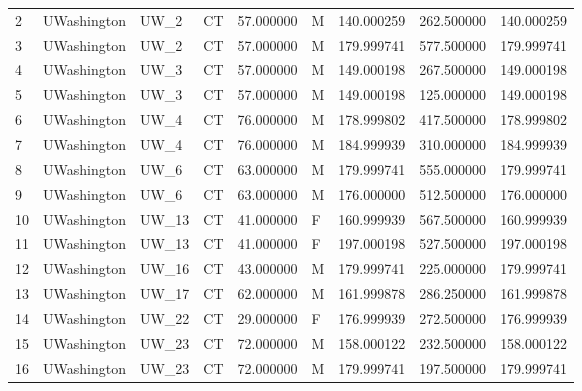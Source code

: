 \begin{tabular}{llllrlrrr}
2      &     UWashington &         UW\_2 &                 CT &  57.000000 &        M &       140.000259 &    262.500000 &  140.000259 \\
3      &     UWashington &         UW\_2 &                 CT &  57.000000 &        M &       179.999741 &    577.500000 &  179.999741 \\
4      &     UWashington &         UW\_3 &                 CT &  57.000000 &        M &       149.000198 &    267.500000 &  149.000198 \\
5      &     UWashington &         UW\_3 &                 CT &  57.000000 &        M &       149.000198 &    125.000000 &  149.000198 \\
6      &     UWashington &         UW\_4 &                 CT &  76.000000 &        M &       178.999802 &    417.500000 &  178.999802 \\
7      &     UWashington &         UW\_4 &                 CT &  76.000000 &        M &       184.999939 &    310.000000 &  184.999939 \\
8      &     UWashington &         UW\_6 &                 CT &  63.000000 &        M &       179.999741 &    555.000000 &  179.999741 \\
9      &     UWashington &         UW\_6 &                 CT &  63.000000 &        M &       176.000000 &    512.500000 &  176.000000 \\
10     &     UWashington &        UW\_13 &                 CT &  41.000000 &        F &       160.999939 &    567.500000 &  160.999939 \\
11     &     UWashington &        UW\_13 &                 CT &  41.000000 &        F &       197.000198 &    527.500000 &  197.000198 \\
12     &     UWashington &        UW\_16 &                 CT &  43.000000 &        M &       179.999741 &    225.000000 &  179.999741 \\
13     &     UWashington &        UW\_17 &                 CT &  62.000000 &        M &       161.999878 &    286.250000 &  161.999878 \\
14     &     UWashington &        UW\_22 &                 CT &  29.000000 &        F &       176.999939 &    272.500000 &  176.999939 \\
15     &     UWashington &        UW\_23 &                 CT &  72.000000 &        M &       158.000122 &    232.500000 &  158.000122 \\
16     &     UWashington &        UW\_23 &                 CT &  72.000000 &        M &       179.999741 &    197.500000 &  179.999741 \\

\end{tabular}
